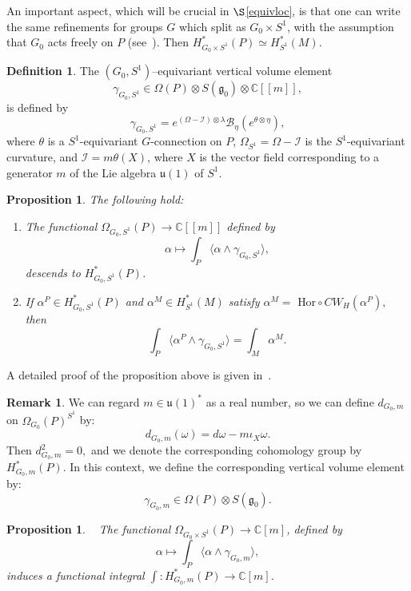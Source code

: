 \documentclass[a4paper,12pt,reqno,sumlimits]{amsart}
\theoremstyle{plain}
\newtheorem{prop}[thm]{Proposition}
\theoremstyle{definition}
\newtheorem{rem}[thm]{Remark}
\newtheorem{defn}[thm]{Definition}
\newcommand{\C}{{\mathbb C}}
\newcommand{\1}{{\bf 1}}
\newcommand{\g}{{\mathfrak  g}}
\newcommand{\uu}{{\mathfrak  u}}
\newcommand{\ex}[1]{{e^{#1}}}
\newcommand{\calB}{{\mathcal B}}
\newcommand{\calI}{{\mathcal I}}
\renewcommand{\to}{\longrightarrow}
\newcommand{\ip}[1]{\langle #1 \rangle}
\numberwithin{equation}{section}
\begin{document}
An important aspect, which will be crucial in $\S$\ref{equivloc}, is
that one can write the same refinements for groups $G$ which split as
$G_0\times S^1$, with the assumption that $G_0$ acts freely on $P$
(see~\cite[Sec 2.6]{radu}). Then $H^*_{G_0\times S^1}(P)\simeq H^*_{S^1}(M).$
\begin{defn}
  The $(G_0,S^1)$--equivariant vertical volume element
  $$
  \gamma_{G_0,S^1}\in\Omega(P)\otimes S(\g_0)\otimes\C[[m]],
  $$
  is defined by
  $$
  \gamma_{G_0,S^1}=\ex{(\Omega-\calI)\otimes\lambda}
  \calB_\eta\left(\ex{\theta\otimes\eta}\right),
  $$
  where $\theta$ is a $S^1$-equivariant $G$-connection on $P$,
  $\Omega_{S^1}=\Omega-\calI$ is the $S^1$-equivariant curvature, and
  $\calI=m\theta(X)$, where $X$ is the vector field corresponding to a
  generator $m$ of the Lie algebra $\uu(1)$ of $S^1$.
\end{defn}
\begin{prop}
  The following hold:
  \begin{enumerate}
  \item The functional $\Omega_{G_0,S^1}(P)\to\C[[m]]$ defined by
    $$
    \alpha\mapsto\int_P\ip{\alpha\wedge\gamma_{G_0,S^1}},
    $$
    descends to $H^*_{G_0,S^1}(P)$.
  \item If $\alpha^P\in H^*_{G_0,S^1}(P)$ and $\alpha^M\in H^*_{S^1}(M)$
    satisfy $\alpha^M=\text{ Hor}\circ CW_H(\alpha^P),$ then
    $$
    \int_P\ip{\alpha^P\wedge\gamma_{G_0,S^1}}=\int_M\alpha^M.
    $$
  \end{enumerate}
\end{prop}
A detailed proof of the proposition above is given in~\cite[p. 38-39]{radu}.
\begin{rem}
  \label{mreal}
  We can regard $m\in\uu(1)^*$ as a real number, so we can define $d_{G_0,m}$
  on $\Omega_{G_0}(P)^{S^1}$ by:
  $$
  d_{G_0,m}(\omega)=d\omega-m\iota_X\omega.
  $$
  Then $d_{G_0,m}^2=0,$ and we denote the corresponding cohomology group
  by $H^*_{G_0,m}(P)$. In this context, we define the corresponding vertical
  volume element by:
  $$
  \gamma_{G_0,m}\in\Omega(P)\otimes S(\g_0).
  $$
\end{rem}

\begin{prop}~\cite[p. 39]{radu}
  The functional $\Omega_{G_0\times S^1}(P)\to\C[m]$, defined by
  $$
  \alpha\mapsto\int_P\ip{\alpha\wedge\gamma_{G_0,m}},
  $$
  induces a functional integral
  $\displaystyle\int:H^*_{G_0,m}(P)\to\C[m]$.
\end{prop}
\end{document}
